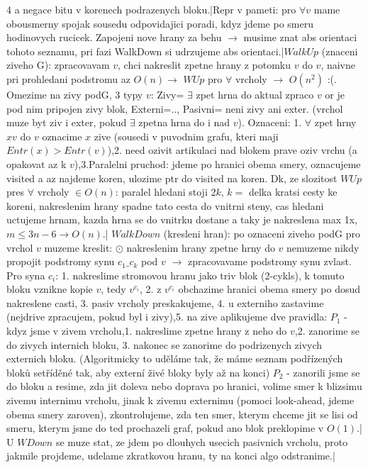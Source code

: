\documentclass[8pt]{extarticle}
\begin{document}
\begin{multicols*}{4}
a negace bitu v korenech podrazenych bloku.|Repr v pameti: pro $\forall v$ mame obousmerny spojak sousedu odpovidajici poradi, kdyz jdeme po smeru hodinovych rucicek. Zapojeni nove hrany za behu $\rightarrow$ musime znat abs orientaci tohoto seznamu, pri fazi WalkDown si udrzujeme abs orientaci.|$WalkUp$ (znaceni ziveho G):  zpracovavam $v$, chci nakreslit zpetne hrany z potomku $v$ do $v$, naivne pri prohledani podstromu az $O(n) \rightarrow$ $WUp$ pro $\forall$ vrcholy $\rightarrow$ $O(n^2)$ :(. Omezime na zivy podG, 3 typy $v$: Zivy= $\exists$ zpet hrna do aktual zpraco $v$ or je pod nim pripojen zivy blok, Externi=.., Pasivni= neni zivy ani exter. (vrchol muze byt ziv i exter, pokud $\exists$ zpetna hrna do i nad $v$). Oznaceni: 1. $\forall$ zpet hrny $xv$ do $v$ oznacime $x$ zive (sousedi v puvodnim grafu, kteri maji $Entr(x)>Entr(v)$),2. need ozivit artikulaci nad blokem prave oziv vrchu (a opakovat az k $v$),3.Paralelni pruchod: jdeme po hranici obema smery, oznacujeme visited a az najdeme koren, ulozime ptr do visited na koren. Dk, ze slozitost $WUp$ pres $\forall$ vrcholy $\in O(n)$: paralel hledani stoji $2k$, $k=$ delka kratsi cesty ke koreni, nakreslenim hrany spadne tato cesta do vnitrni steny, cas hledani uctujeme hrnam, kazda hrna se do vnitrku dostane a taky je nakreslena max 1x, $m\leq 3n-6 \rightarrow O(n)$.| $WalkDown$ (kresleni hran): po oznaceni ziveho podG pro vrchol $v$ muzeme kreslit: $\odot$ nakreslenim hrany zpetne hrny do $v$ nemuzeme nikdy propojit podstromy synu $c_1\_c_k$ pod $v$ $\rightarrow$ zpracovavame podstromy synu zvlast. Pro syna $c_i$: 1. nakreslime stromovou hranu jako triv blok (2-cykls), k tomuto bloku vznikne kopie $v$, tedy $v^{c_i}$, 2. z $v^{c_i}$ obchazime hranici obema smery po dosud nakreslene casti, 3. pasiv vrcholy preskakujeme, 4. u externiho zastavime (nejdrive zpracujem, pokud byl i zivy),5. na zive aplikujeme dve pravidla: $P_1$ - kdyz jsme v zivem vrcholu,1. nakreslime zpetne hrany z neho do $v$,2. zanorime se do zivych internich bloku, 3. nakonec 
se zanorime do podrizenych zivych externich bloku. (Algoritmicky to uděláme tak, že máme seznam podřízených bloků setříděné tak, aby externí živé bloky byly až na konci) %
$P_2$ - zanorili jsme se do bloku a resime, zda jit doleva nebo doprava po hranici, volime smer k blizsimu zivemu internimu vrcholu, jinak k zivemu externimu (pomoci look-ahead, jdeme obema smery zaroven), zkontrolujeme, zda ten smer, kterym chceme jit se lisi od smeru, kterym jsme do ted prochazeli graf, pokud ano blok preklopime v $O(1)$.| U $WDown$ se muze stat, ze jdem po dlouhych usecich pasivnich vrcholu, proto jakmile projdeme, udelame zkratkovou hranu, ty na konci algo odstranime.|
$$
\end{multicols*}
\end{document}
